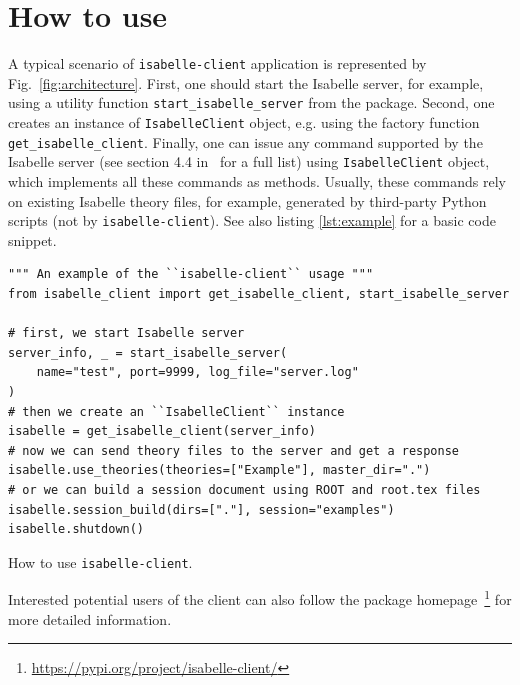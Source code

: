 \documentclass[runningheads]{llncs}
\begin{document}
\section{How to use}
A typical scenario of \texttt{isabelle-client} application is represented by Fig.~\ref{fig:architecture}. First, one should start the Isabelle server, for example, using a utility function \texttt{start\_isabelle\_server} from the package. Second, one creates an instance of \texttt{IsabelleClient} object, e.g. using the factory function \texttt{get\_isabelle\_client}. Finally, one can issue any command supported by the Isabelle server (see section 4.4 in~\cite{IsabelleSystemManual} for a full list) using \texttt{IsabelleClient} object, which implements all these commands as methods. Usually, these commands rely on existing Isabelle theory files, for example, generated by third-party Python scripts (not by \texttt{isabelle-client}). See also listing \ref{lst:example} for a basic code snippet.

\begin{listing}[H]
\begin{verbatim}
""" An example of the ``isabelle-client`` usage """
from isabelle_client import get_isabelle_client, start_isabelle_server

# first, we start Isabelle server
server_info, _ = start_isabelle_server(
    name="test", port=9999, log_file="server.log"
)
# then we create an ``IsabelleClient`` instance
isabelle = get_isabelle_client(server_info)
# now we can send theory files to the server and get a response
isabelle.use_theories(theories=["Example"], master_dir=".")
# or we can build a session document using ROOT and root.tex files
isabelle.session_build(dirs=["."], session="examples")
isabelle.shutdown()
\end{verbatim}
\caption{How to use \texttt{isabelle-client}.}
\label{lst:example}
\end{listing}

Interested potential users of the client can also follow the package homepage~\footnote{\href{https://pypi.org/project/isabelle-client/}{https://pypi.org/project/isabelle-client/}} for more detailed information.
\end{document}
